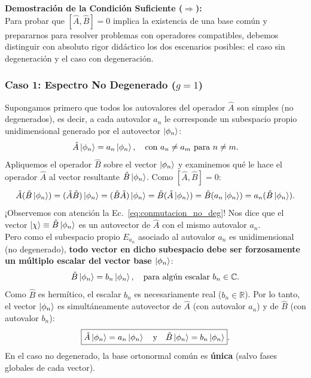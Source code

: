 \textbf{Demostración de la Condición Suficiente ($\Rightarrow$):}\\
Para probar que $[\hat{A}, \hat{B}] = 0$ implica la existencia de una base común y prepararnos para resolver problemas con operadores compatibles, debemos distinguir con absoluto rigor didáctico los dos escenarios posibles: el caso sin degeneración y el caso con degeneración.

\subsubsection{Caso 1: Espectro No Degenerado ($g = 1$)}

Supongamos primero que todos los autovalores del operador $\hat{A}$ son simples (no degenerados), es decir, a cada autovalor $a_n$ le corresponde un subespacio propio unidimensional generado por el autovector $\left| \phi_n \right\rangle$:
\begin{equation}
    \hat{A}\left| \phi_n \right\rangle = a_n\left| \phi_n \right\rangle, \quad \text{con } a_n \neq a_m \text{ para } n \neq m.
\end{equation}
Apliquemos el operador $\hat{B}$ sobre el vector $\left| \phi_n \right\rangle$ y examinemos qué le hace el operador $\hat{A}$ al vector resultante $\hat{B}\left| \phi_n \right\rangle$. Como $[\hat{A}, \hat{B}] = 0$:
\begin{equation}
    \hat{A}(\hat{B}\left| \phi_n \right\rangle) = (\hat{A}\hat{B})\left| \phi_n \right\rangle = (\hat{B}\hat{A})\left| \phi_n \right\rangle = \hat{B}(\hat{A}\left| \phi_n \right\rangle) = \hat{B}(a_n\left| \phi_n \right\rangle) = a_n(\hat{B}\left| \phi_n \right\rangle).
    \label{eq:conmutacion_no_deg}
\end{equation}
¡Observemos con atención la Ec.~\eqref{eq:conmutacion_no_deg}! Nos dice que el vector $\left| \chi \right\rangle \equiv \hat{B}\left| \phi_n \right\rangle$ es un autovector de $\hat{A}$ con el mismo autovalor $a_n$.\\
Pero como el subespacio propio $E_{a_n}$ asociado al autovalor $a_n$ es unidimensional (no degenerado), \textbf{todo vector en dicho subespacio debe ser forzosamente un múltiplo escalar del vector base $\left| \phi_n \right\rangle$}:
\begin{equation}
    \hat{B}\left| \phi_n \right\rangle = b_n\left| \phi_n \right\rangle, \quad \text{para algún escalar } b_n \in \mathbb{C}.
\end{equation}
Como $\hat{B}$ es hermítico, el escalar $b_n$ es necesariamente real ($b_n \in \mathbb{R}$). Por lo tanto, el vector $\left| \phi_n \right\rangle$ es simultáneamente autovector de $\hat{A}$ (con autovalor $a_n$) y de $\hat{B}$ (con autovalor $b_n$):
\begin{equation}
    \boxed{\hat{A}\left| \phi_n \right\rangle = a_n\left| \phi_n \right\rangle \quad \text{y} \quad \hat{B}\left| \phi_n \right\rangle = b_n\left| \phi_n \right\rangle}.
\end{equation}
En el caso no degenerado, la base ortonormal común es \textbf{única} (salvo fases globales de cada vector).

